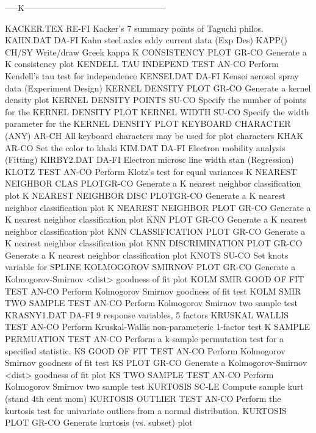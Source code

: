 -----K--------------------------------------------------

KACKER.TEX                  RE-FI Kacker's 7 summary points of Taguchi philos.
KAHN.DAT                    DA-FI Kahn steel axles eddy current data (Exp Des)
KAPP()                      CH/SY Write/draw Greek kappa
K CONSISTENCY PLOT          GR-CO Generate a K consistency plot
KENDELL TAU INDEPEND TEST   AN-CO Perform Kendell's tau test for independence
KENSEI.DAT                  DA-FI Kensei aerosol spray data (Experiment Design)
KERNEL DENSITY PLOT         GR-CO Generate a kernel density plot
KERNEL DENSITY POINTS       SU-CO Specify the number of points for the KERNEL DENSITY PLOT
KERNEL WIDTH                SU-CO Specify the width parameter for the KERNEL DENSITY PLOT
KEYBOARD CHARACTER (ANY)    AR-CH All keyboard characters may be used for plot characters
KHAK                        AR-CO Set the color to khaki
KIM.DAT                     DA-FI Electron mobility analysis (Fitting)
KIRBY2.DAT                  DA-FI Electron microsc line width stan (Regression)
KLOTZ TEST                  AN-CO Perform Klotz's test for equal variances
K NEAREST NEIGHBOR CLAS PLOTGR-CO Generate a K nearest neighbor classification plot
K NEAREST NEIGHBOR DISC PLOTGR-CO Generate a K nearest neighbor classification plot
K NEAREST NEIGHBOR PLOT     GR-CO Generate a K nearest neighbor classification plot
KNN PLOT                    GR-CO Generate a K nearest neighbor classification plot
KNN CLASSIFICATION PLOT     GR-CO Generate a K nearest neighbor classification plot
KNN DISCRIMINATION PLOT     GR-CO Generate a K nearest neighbor classification plot
KNOTS                       SU-CO Set knots variable for SPLINE
KOLMOGOROV SMIRNOV PLOT     GR-CO Generate a Kolmogorov-Smirnov <dist> goodness of fit plot
KOLM SMIR GOOD OF FIT TEST  AN-CO Perform Kolmogorov Smirnov goodness of fit test
KOLM SMIR TWO SAMPLE TEST   AN-CO Perform Kolmogorov Smirnov two sample test
KRASNY1.DAT                 DA-FI 9 response variables, 5 factors
KRUSKAL WALLIS TEST         AN-CO Perform Kruskal-Wallis non-parameteric 1-factor test
K SAMPLE PERMUATION TEST    AN-CO Perform a k-sample permutation test for a specified statistic.
KS GOOD OF FIT TEST         AN-CO Perform Kolmogorov Smirnov goodness of fit test
KS PLOT                     GR-CO Generate a Kolmogorov-Smirnov <dist> goodness of fit plot
KS TWO SAMPLE TEST          AN-CO Perform Kolmogorov Smirnov two sample test
KURTOSIS                    SC-LE Compute sample kurt (stand 4th cent mom)
KURTOSIS OUTLIER TEST       AN-CO Perform the kurtosis test for univariate outliers from a normal distribution.
KURTOSIS PLOT               GR-CO Generate kurtosis (vs. subset) plot

